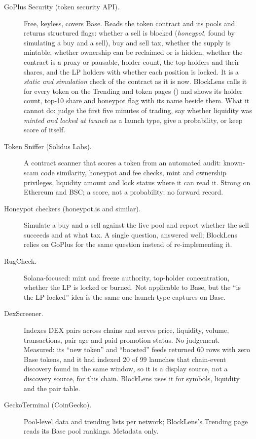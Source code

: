 \begin{description}
  \item[GoPlus Security (token security API).] Free, keyless, covers Base. Reads the token contract and its pools and returns structured flags: whether a sell is blocked (\emph{honeypot}, found by simulating a buy and a sell), buy and sell tax, whether the supply is mintable, whether ownership can be reclaimed or is hidden, whether the contract is a proxy or pausable, holder count, the top holders and their shares, and the LP holders with whether each position is locked. It is a \emph{static and simulation} check of the contract as it is now. BlockLens calls it for every token on the Trending and token pages () and shows its holder count, top-10 share and honeypot flag with its name beside them. What it cannot do: judge the first five minutes of trading, say whether liquidity was \emph{minted and locked at launch} as a launch type, give a probability, or keep score of itself.
  \item[Token Sniffer (Solidus Labs).] A contract scanner that scores a token from an automated audit: known-scam code similarity, honeypot and fee checks, mint and ownership privileges, liquidity amount and lock status where it can read it. Strong on Ethereum and BSC; a score, not a probability; no forward record.
  \item[Honeypot checkers (honeypot.is and similar).] Simulate a buy and a sell against the live pool and report whether the sell succeeds and at what tax. A single question, answered well; BlockLens relies on GoPlus for the same question instead of re-implementing it.
  \item[RugCheck.] Solana-focused: mint and freeze authority, top-holder concentration, whether the LP is locked or burned. Not applicable to Base, but the ``is the LP locked'' idea is the same one launch type captures on Base.
  \item[DexScreener.] Indexes DEX pairs across chains and serves price, liquidity, volume, transactions, pair age and paid promotion status. No judgement. Measured: its ``new token'' and ``boosted'' feeds returned 60 rows with zero Base tokens, and it had indexed 20 of 99 launches that chain-event discovery found in the same window, so it is a display source, not a discovery source, for this chain. BlockLens uses it for symbols, liquidity and the pair table.
  \item[GeckoTerminal (CoinGecko).] Pool-level data and trending lists per network; BlockLens's Trending page reads its Base pool rankings. Metadata only.

\end{description}
